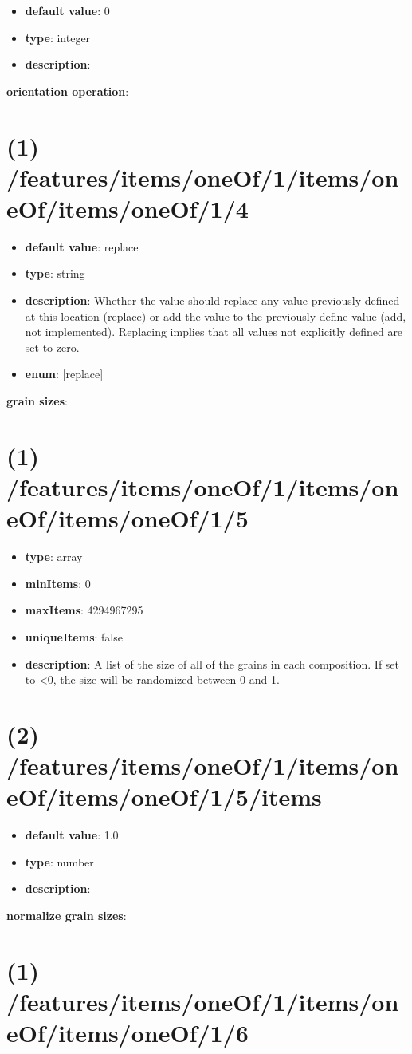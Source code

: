 \begin{itemize}[leftmargin=2em]\item {\bf default value}: 0
\item {\bf type}: integer
\item {\bf description}: 
\end{itemize}\item {\bf orientation operation}: \section{(1) /features/items/oneOf/1/items/oneOf/items/oneOf/1/4}
\begin{itemize}[leftmargin=1em]\item {\bf default value}: replace
\item {\bf type}: string
\item {\bf description}: Whether the value should replace any value previously defined at this location (replace) or add the value to the previously define value (add, not implemented). Replacing implies that all values not explicitly defined are set to zero.
\item {\bf enum}: [replace]\end{itemize}\item {\bf grain sizes}: \section{(1) /features/items/oneOf/1/items/oneOf/items/oneOf/1/5}
\begin{itemize}[leftmargin=1em]\item {\bf type}: array
\item {\bf minItems}: 0
\item {\bf maxItems}: 4294967295
\item {\bf uniqueItems}: false
\item {\bf description}: A list of the size of all of the grains in each composition. If set to <0, the size will be randomized between 0 and 1.
\end{itemize}\section{(2) /features/items/oneOf/1/items/oneOf/items/oneOf/1/5/items}
\begin{itemize}[leftmargin=2em]\item {\bf default value}: 1.0
\item {\bf type}: number
\item {\bf description}: 
\end{itemize}\item {\bf normalize grain sizes}: \section{(1) /features/items/oneOf/1/items/oneOf/items/oneOf/1/6}
